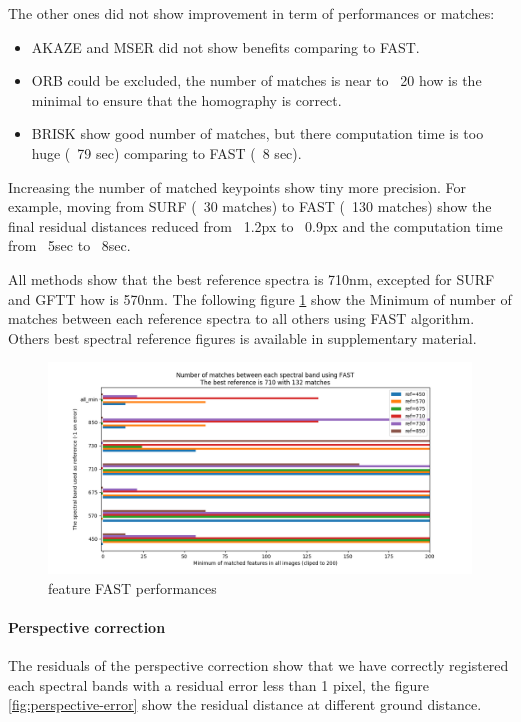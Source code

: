 \documentclass[]{elsarticle}
\begin{document}
	\noindent
	The other ones did not show improvement in term of performances or matches:
	\begin{itemize}
		\item AKAZE and MSER did not show benefits comparing to FAST.
		\item ORB could be excluded, the number of matches is near to ~20 how is the minimal to ensure that the homography is correct.
		\item BRISK show good number of matches, but there computation time is too huge (~79 sec) comparing to FAST (~8 sec).
	\end{itemize}
	
	Increasing the number of matched keypoints show tiny more precision. For example, moving from SURF (~30 matches) to FAST (~130 matches)
	show the final residual distances reduced from ~1.2px to ~0.9px and the computation time from ~5sec to ~8sec.
	
	All methods show that the best reference spectra is 710nm, excepted for SURF and GFTT how is 570nm.
	The following figure \ref{fig:features-FAST-performances} show the Minimum of number of matches between each reference spectra to all others using FAST algorithm.
	Others best spectral reference figures is available in supplementary material.
	
	\begin{figure}[!htb]
		\centering
		\includegraphics[width=\linewidth]{../figures/comparaison-keypoint-matching-reference-FAST.png}
		\caption{feature FAST performances}
		\label{fig:features-FAST-performances}
	\end{figure}
	
	\paragraph{Perspective correction}
	The residuals of the perspective correction
	show that we have correctly registered each spectral bands with a residual error less than 1 pixel,
	the figure \ref{fig:perspective-error} show the residual distance at different ground distance.
	
\end{document}
